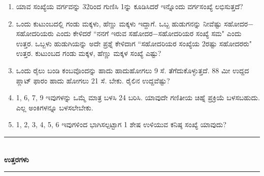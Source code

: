\begin{enumerate}
\item ಯಾವ ಸಂಖ್ಯೆಯ ವರ್ಗವನ್ನು 32ರಿಂದ ಗುಣಿಸಿ 1ನ್ನು ಕೂಡಿಸಿದರೆ ಇನ್ನೊಂದು ವರ್ಗಸಂಖ್ಯೆ ಲಭಿಸುತ್ತದೆ? 

\item ಒಂದು ಕುಟುಂಬದಲ್ಲಿ ಗಂಡು ಮಕ್ಕಳು, ಹೆಣ್ಣು ಮಕ್ಕಳು ಇದ್ದಾಗೆ. ಒಬ್ಬ ಹುಡುಗನನ್ನು ನೀವೆಷ್ಟು ಸಹೋದರ$-$ಸಹೋದರಿಯರು ಎಂದು ಕೇಳಿದರೆ ``ನನಗೆ ಇರುವ ಸಹೋದರ$-$ಸಹೋದರಿಯರ ಸಂಖ್ಯೆ ಸಮ" ಎಂದು ಉತ್ತರ. ಒಬ್ಬಳು ಹುಡುಗಿಯನ್ನು ಅದೇ ಪ್ರಶ್ನೆ ಕೇಳಿದಾಗ ``ಸಹೋದರಿಯರ ಸಂಖ್ಯೆಯ 2ರಷ್ಟು ಸಹೋದರರು" ಉತ್ತರ. ಕುಟುಂಬದ ಗಂಡು ಮಕ್ಕಳ, ಹೆಣ್ಣು ಮಕ್ಕಳ ಸಂಖ್ಯೆ ಎಷ್ಟು? 

\item ಒಂದು ರೈಲು ಬಂಡಿ ಕಂಬವೊಂದನ್ನು ಹಾದು ಹಾದುಹೋಗಲು 9 ಸೆ. ತೆಗೆದುಕೊಳ್ಳುತ್ತದೆ. 88 ಮೀ ಉದ್ದದ ಪ್ಲಾಟ್ ಫಾರಂ ಹಾದು ಹೋಗಲು 21 ಸೆ. ಬೇಕು. ರೈಲಿನ ಉದ್ದವೆಷ್ಟು? 

\item 1, 6, 7, 9 ಇವುಗಳನ್ನು ಒಮ್ಮೆ ಮಾತ್ರ ಬಳಸಿ 24 ಬರಿಸಿ. ಯಾವುದೇ ಗಣಿತೀಯ ಚಿಹ್ನೆ ಪ್ರಕ್ರಿಯೆ ಬಳಸಬಹುದು. ಎಲ್ಲ ಅಂಕಿಗಳನ್ನೂ ಬಳಸಲೇಬೇಕು. 

\item 1, 2, 3, 4, 5, 6 ಇವುಗಳಿಂದ ಭಾಗಿಸಲ್ಪಟ್ಟಾಗ 1 ಶೇಷ ಉಳಿಯುವ ಕನಿಷ್ಠ ಸಂಖ್ಯೆ ಯಾವುದು? 
\end{enumerate}

\smallskip

\begin{center}
\rule{5cm}{1pt}\\[3pt]
{\Large\bfseries ಉತ್ತರಗಳು}\\[-0.1cm]
\rule{5cm}{1pt}
\end{center}

